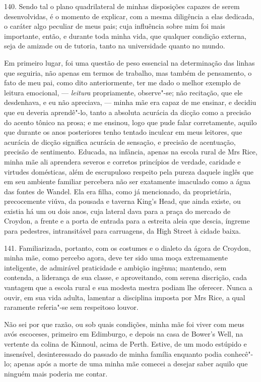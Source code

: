 140. Sendo tal o plano quadrilateral de minhas disposições capazes de
serem desenvolvidas, é o momento de explicar, com a mesma diligência a
elas dedicada, o caráter algo peculiar de meus pais; cuja influência
sobre mim foi mais importante, então, e durante toda minha vida, que
qualquer condição externa, seja de amizade ou de tutoria, tanto na
universidade quanto no mundo.

Em primeiro lugar, foi uma questão de peso essencial na determinação das
linhas que seguiria, não apenas em termos de trabalho, mas também de
pensamento, o fato de meu pai, como dito anteriormente, ter me dado o
melhor exemplo de leitura emocional, --- \emph{leitura} propriamente,
observe"-se; não recitação, que ele desdenhava, e eu não apreciava, ---
minha mãe era capaz de me ensinar, e decidiu que eu deveria aprendê"-lo,
tanto a absoluta acurácia da dicção como a precisão do acento tônico na
prosa; e me ensinou, logo que pude falar corretamente, aquilo que
durante os anos posteriores tenho tentado inculcar em meus leitores, que
acurácia de dicção significa acurácia de sensação, e precisão de
acentuação, precisão de sentimento. Educada, na infância, apenas na
escola rural de Mrs Rice, minha mãe ali aprendera severos e corretos
princípios de verdade, caridade e virtudes domésticas, além de
escrupuloso respeito pela pureza daquele inglês que em seu ambiente
familiar percebera não ser exatamente imaculado como a água das fontes
de Wandel. Ela era filha, como já mencionado, da proprietária,
precocemente viúva, da pousada e taverna King's Head, que ainda existe,
ou existia há um ou dois anos, cuja lateral dava para a praça do mercado
de Croydon, a frente e a porta de entrada para a estreita aleia que
descia, íngreme para pedestres, intransitável para carruagens, da High
Street à cidade baixa.

141. Familiarizada, portanto, com os costumes e o dialeto da ágora de
Croydon, minha mãe, como percebo agora, deve ter sido uma moça
extremamente inteligente, de admirável praticidade e ambição ingênua;
mantendo, sem contenda, a liderança de sua classe, e aproveitando, com
serena discrição, cada vantagem que a escola rural e sua modesta mestra
podiam lhe oferecer. Nunca a ouvir, em sua vida adulta, lamentar a
disciplina imposta por Mrs Rice, a qual raramente referia"-se sem
respeitoso louvor.

Não sei por que razão, ou sob quais condições, minha mãe foi viver com
meus avós escoceses, primeiro em Edimburgo, e depois na casa de Bower's
Well, na vertente da colina de Kinnoul, acima de Perth. Estive, de um
modo estúpido e insensível, desinteressado do passado de minha família
enquanto podia conhecê"-lo; apenas após a morte de uma minha mãe comecei
a desejar saber aquilo que ninguém mais poderia me contar.

